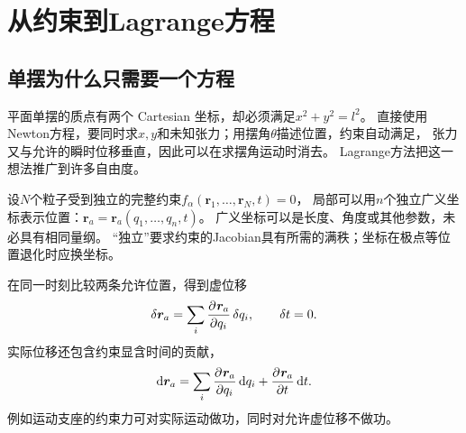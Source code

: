\chapter{从约束到Lagrange方程}

\section{单摆为什么只需要一个方程}
平面单摆的质点有两个 Cartesian 坐标，却必须满足$x^2 + y^2 = l^2$。
直接使用Newton方程，要同时求$x,y$和未知张力；用摆角$\theta$描述位置，约束自动满足，
张力又与允许的瞬时位移垂直，因此可以在求摆角运动时消去。
Lagrange方法把这一想法推广到许多自由度。

设$N$个粒子受到独立的完整约束$f_\alpha(\bm r_1,\ldots,\bm r_N,t) = 0$，
局部可以用$n$个独立广义坐标表示位置：$\bm r_a = \bm r_a(q_1,\ldots,q_n,t)$。
广义坐标可以是长度、角度或其他参数，未必具有相同量纲。
“独立”要求约束的Jacobian具有所需的满秩；坐标在极点等位置退化时应换坐标。

在同一时刻比较两条允许位置，得到虚位移
\begin{equation}
 \mathop{}\!\delta\bm r_a = \sum_i\frac{\partial^{}\bm r_a}{\partial{q_i}^{}}\mathop{}\!\delta q_i,\qquad \mathop{}\!\delta t = 0.
\end{equation}
实际位移还包含约束显含时间的贡献，
\begin{equation}\label{eq:cm-actual-displacement}
 \mathop{}\!\mathrm{d}\bm r_a = \sum_i\frac{\partial^{}\bm r_a}{\partial{q_i}^{}}\mathop{}\!\mathrm{d} q_i + \frac{\partial^{}\bm r_a}{\partial{t}^{}}\mathop{}\!\mathrm{d} t.
\end{equation}
例如运动支座的约束力可对实际运动做功，同时对允许虚位移不做功。

